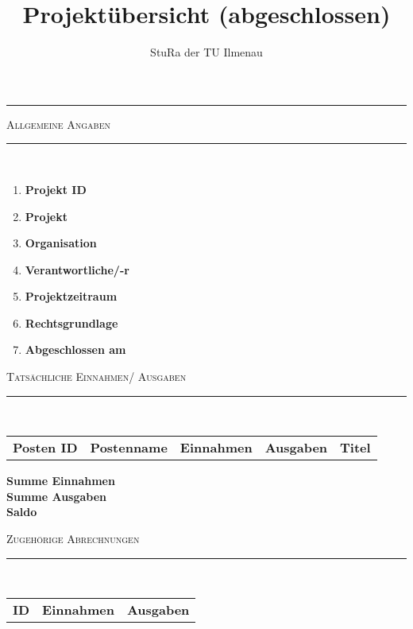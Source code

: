 \documentclass[a4paper,11pt]{article}
\makeatletter
\newcommand{\linia}{\rule{\linewidth}{0.5pt}}
\newcommand{\mysection}[1]{
	\begin{center}
	{\large \textsc{#1}}
	\vspace*{-0.5cm}
	\\\linia\\
	\vspace*{-0.5cm}
	\end{center}
}
\theoremstyle{mytheor}
\renewcommand{\maketitle}{
	\begin{center}
	\vspace*{-0.5cm}
	{\huge \textsc{\@title}}
	\linia
	\end{center}
}
\makeatother
\begin{document}
\title{Projektübersicht (abgeschlossen)}
\author{StuRa der TU Ilmenau}

\vspace*{-2.0cm}
\begin{figure}[h]
\centering
\end{figure}

\maketitle

\vspace*{-0.5cm}

\mysection{Allgemeine Angaben}

\begin{enumerate}[label=\Roman*]
\itemsep-2mm
\item \textbf{Projekt ID}\hfill 
\item \textbf{Projekt}\hfill 
\item \textbf{Organisation} \hfill 
\item \textbf{Verantwortliche/-r} \hfill 
\item \textbf{Projektzeitraum} \hfill 
\item \textbf{Rechtsgrundlage} \hfill
\item \textbf{Abgeschlossen am} \hfill 
\end{enumerate}

\vspace{1cm}

\mysection{Tatsächliche Einnahmen/ Ausgaben}

\begin{center}
\begin{tabular}{rrrrr}
\textbf{Posten ID} & \textbf{Postenname} & \textbf{Einnahmen} & \textbf{Ausgaben} & \textbf{Titel}\\ 
\end{tabular}
\end{center}
\vspace{0,5cm}
\textbf{Summe Einnahmen} \hfill \\
\textbf{Summe Ausgaben}\hfill \\
\textbf{Saldo} \hfill

\vspace{1cm}

\mysection{Zugehörige Abrechnungen}
\begin{center}
	\begin{tabular}{rrr}
		\textbf{ID} &  \textbf{Einnahmen} & \textbf{Ausgaben} \\ 
	\end{tabular}
\end{center}
\end{document}
